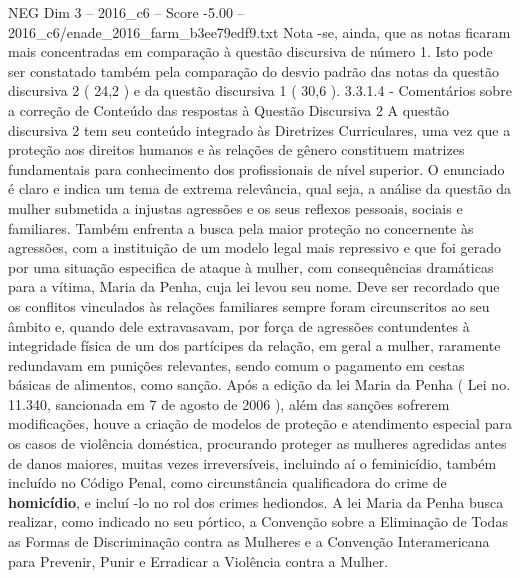 \begin{textsample}{NEG Dim 3 – 2016\_c6 – Score -5.00 – 2016\_c6/enade\_2016\_farm\_b3ee79edf9.txt}
Nota -se, ainda, que as notas ficaram mais concentradas em comparação à questão discursiva de número 1.
Isto pode ser constatado também pela comparação do desvio padrão das notas da questão discursiva 2 ( 24,2 ) e da questão discursiva 1 ( 30,6 ). 3.3.1.4 - Comentários sobre a correção de Conteúdo das respostas à Questão Discursiva 2 A questão discursiva 2 tem seu conteúdo integrado às Diretrizes Curriculares, uma vez que a proteção aos direitos humanos e às relações de gênero constituem matrizes fundamentais para conhecimento dos profissionais de nível superior.
O enunciado é claro e indica um tema de extrema relevância, qual seja, a análise da questão da mulher submetida a injustas agressões e os seus reflexos pessoais, sociais e familiares.
Também enfrenta a busca pela maior proteção no concernente às agressões, com a instituição de um modelo legal mais repressivo e que foi gerado por uma situação especifica de ataque à mulher, com consequências dramáticas para a vítima, Maria da Penha, cuja lei levou seu nome.
Deve ser recordado que os conflitos vinculados às relações familiares sempre foram circunscritos ao seu âmbito e, quando dele extravasavam, por força de agressões contundentes à integridade física de um dos partícipes da relação, em geral a mulher, raramente redundavam em punições relevantes, sendo comum o pagamento em cestas básicas de alimentos, como sanção.
Após a edição da lei Maria da Penha ( Lei no. 11.340, sancionada em 7 de agosto de 2006 ), além das sanções sofrerem modificações, houve a criação de modelos de proteção e atendimento especial para os casos de violência doméstica, procurando proteger as mulheres agredidas antes de danos maiores, muitas vezes irreversíveis, incluindo aí o feminicídio, também incluído no Código Penal, como circunstância qualificadora do crime de \textbf{homicídio}, e incluí -lo no rol dos crimes hediondos.
A lei Maria da Penha busca realizar, como indicado no seu pórtico, a Convenção sobre a Eliminação de Todas as Formas de Discriminação contra as Mulheres e a Convenção Interamericana para Prevenir, Punir e Erradicar a Violência contra a Mulher.

\end{textsample}

